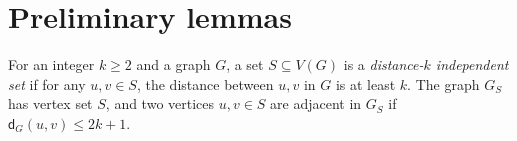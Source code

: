 \documentclass[a4paper]{article}
\newcommand{\distG}[3]{\mathsf{d}_{#1}\left(#2,#3\right)}
\newtheorem{Question}{Question}
\newtheorem{definition}{Definition}
\begin{document}
 
% 
% 
% 
 
% 
%

\newpage

\section{Preliminary lemmas}

\newcommand{\IndGraph}[2]{{#1}_{#2}}
For an integer $k\geq 2$ and a graph $G$, a set $S\subseteq V(G)$ is a \emph{distance-$k$ independent set} if for any $u,v\in S$, the distance between $u,v$ in $G$ is at least $k$. The graph $\IndGraph{G}{S}$ has vertex set $S$, and two vertices $u,v\in S$ are adjacent in $\IndGraph{G}{S}$ if $\distG{G}{u}{v}\leq 2k+1$. 
\end{document}
